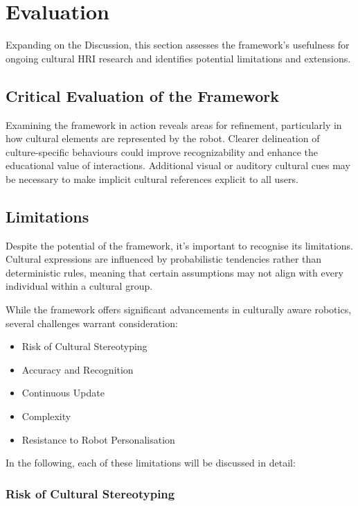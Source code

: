 
\chapter{Evaluation}

Expanding on the Discussion, this section assesses the framework's usefulness for ongoing cultural HRI research and identifies potential limitations and extensions.

\section{Critical Evaluation of the Framework}

Examining the framework in action reveals areas for refinement, particularly in how cultural elements are represented by the robot. Clearer delineation of culture-specific behaviours could improve recognizability and enhance the educational value of interactions. Additional visual or auditory cultural cues may be necessary to make implicit cultural references explicit to all users.

\section{Limitations}

Despite the potential of the framework, it's important to recognise its limitations. Cultural expressions are influenced by probabilistic tendencies rather than deterministic rules, meaning that certain assumptions may not align with every individual within a cultural group.

While the framework offers significant advancements in culturally aware robotics, several challenges warrant consideration:

\begin{itemize}
\item Risk of Cultural Stereotyping
\item Accuracy and Recognition
\item Continuous Update
\item Complexity
\item Resistance to Robot Personalisation
\end{itemize}

In the following, each of these limitations will be discussed in detail:

\subsection{Risk of Cultural Stereotyping}


